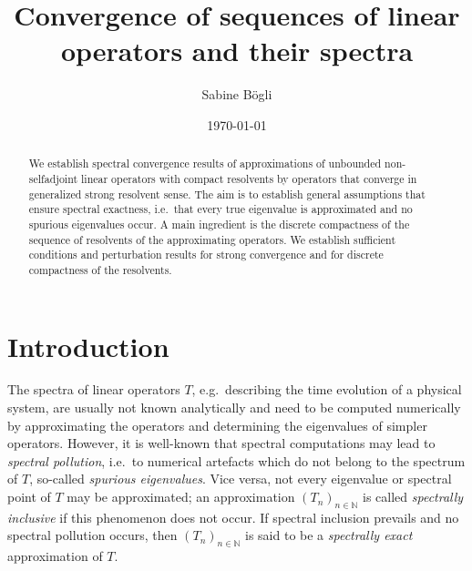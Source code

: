 \documentclass[a4paper,reqno]{amsart}
\begin{document}
\theoremstyle{plain}
\newtheorem{theorem}{Theorem}[section]
\newtheorem{lemma}[theorem]{Lemma}
\newtheorem{criterion}[theorem]{Criterion}
\newtheorem{prop}[theorem]{Proposition}
\newtheorem{corollary}[theorem]{Corollary}

\theoremstyle{definition} 
\newtheorem{definition}[theorem]{Definition}
\newtheorem{example}[theorem]{Example}
\newtheorem{rem}[theorem]{Remark}
\newtheorem{notation}[theorem]{Notation}
\newtheorem{ass}[theorem]{Assumption}

\title{Convergence of sequences of linear operators and their spectra}

\author{Sabine B\"ogli}
\address[S.\ B\"ogli]{
Department of Mathematics,
Imperial College London,
Huxley Building,
180 Queen's Gate, London SW7 2AZ, UK}



\date{
\today
}

\begin{abstract}
We establish spectral convergence results of approximations of unbounded non-selfadjoint linear operators with compact resolvents by operators that converge in generalized strong resolvent sense.
The aim is to establish general assumptions that ensure spectral exactness, i.e.\ that every true eigenvalue is approximated and no spurious eigenvalues occur.
A main ingredient is the discrete compactness of the sequence of resolvents of the approximating operators.
We establish sufficient conditions and perturbation results for strong convergence and for discrete compactness of the resolvents.
\vspace{-0.7mm}
\end{abstract}

\maketitle

\section{Introduction}
The spectra of linear operators $T$, e.g.\ describing the time evolution of a physical system, are usually not known analytically 
and need to be computed numerically by approximating the operators and determining the eigenvalues of simpler operators. 
However, it is well-known that spectral computations may lead to \emph{spectral pollution}, i.e.\ to 
numerical artefacts which do not belong to the spectrum of $T$, so-called \emph{spurious eigenvalues}.
Vice versa, not every eigenvalue or spectral point of $T$ may be approximated; an approximation $(T_n)_{n\in{\mathbb{N}}}$ is called \emph{spectrally inclusive}
if this phenomenon does not occur. 
If spectral inclusion prevails and no spectral pollution occurs, then $(T_n)_{n\in{\mathbb{N}}}$ is said to be a \emph{spectrally exact} approximation of $T$.
\end{document}
